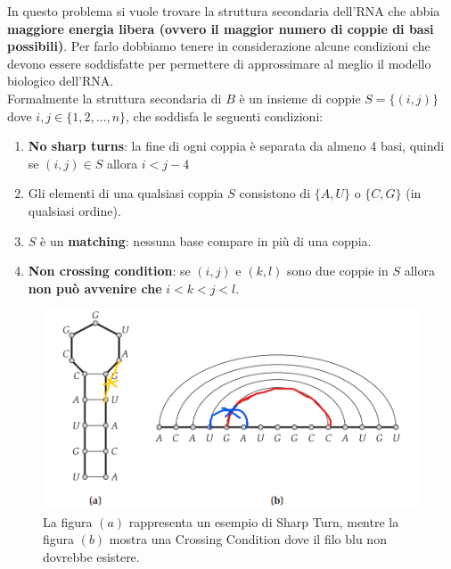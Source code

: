 In questo problema si vuole trovare la struttura secondaria dell'RNA che
abbia \textbf{maggiore energia libera (ovvero il maggior numero di
  coppie di basi possibili)}. Per farlo dobbiamo tenere in considerazione
alcune condizioni che devono essere soddisfatte per permettere di
approssimare al meglio il modello biologico dell'RNA.\\

Formalmente la struttura secondaria di $B$ è un insieme di coppie
$S = \{(i,j)\}$ dove $i,j \in \{1,2,\ldots,n\}$, che soddisfa le
seguenti condizioni:

\begin{enumerate}
  \def\labelenumi{\arabic{enumi}.}
  \item \label{ss:1}
        \textbf{No sharp turns}: la fine di ogni coppia è separata da almeno 4
        basi, quindi se $(i,j) \in S$ allora $i < j - 4$
  \item \label{ss:2}
        Gli elementi di una qualsiasi coppia $S$ consistono di $\{A, U\}$
        o $\{C, G\}$ (in qualsiasi ordine).
  \item
        $S$ è un \textbf{matching}: nessuna base compare in più di una
        coppia.
  \item
        \textbf{Non crossing condition}: se $(i, j)$ e $(k,l)$ sono due
        coppie in $S$ allora \textbf{non può avvenire che}
        $i < k < j < l$.
\end{enumerate}

\begin{figure}[H]
  \includegraphics[width=\textwidth, keepaspectratio]{capitoli/programmazione_dinamica/imgs/rna2.png}
  \centering
  \caption{La figura $(a)$ rappresenta un esempio di Sharp Turn, mentre la
    figura $(b)$ mostra una Crossing Condition dove il filo blu non dovrebbe
    esistere.}
\end{figure}

